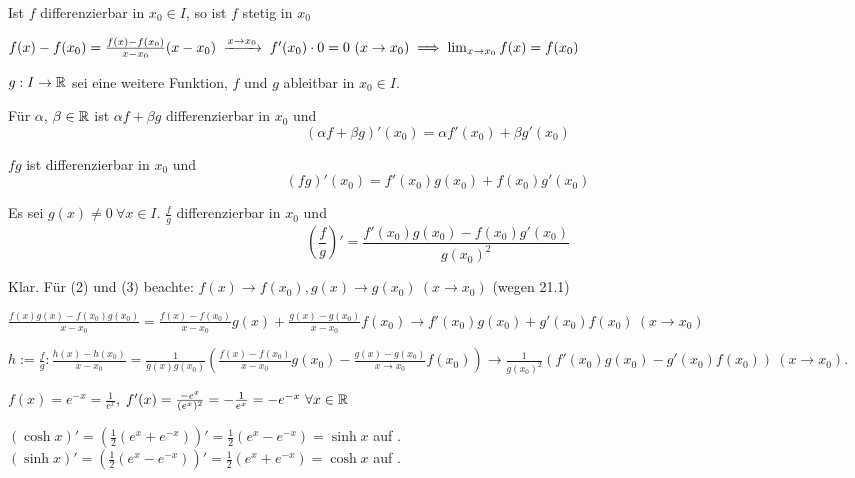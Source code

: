 \documentclass[a4paper,twoside,DIV15,BCOR12mm]{scrbook}
\begin{document}
\begin{satz}
Ist $f$ differenzierbar in $x_0\in I$, so ist $f$ stetig in $x_0$
\end{satz}

\begin{beweis}
$f(x)-f(x_0) = \frac{f(x)-f(x_0)}{x-x_0}(x-x_0) \towegen{x\to x_0} f'(x_0)\cdot 0 = 0 \ (x\to x_0) \folgt \lim_{x\to x_0}f(x) = f(x_0)$
\end{beweis}

\begin{satz}[Ableitungsregeln]
$g:I\to\mathbb{R}$ sei eine weitere Funktion, $f$ und $g$ ableitbar in $x_0 \in I$.
\begin{liste}
\item Für $\alpha$, $\beta \in \mathbb{R}$ ist $\alpha f + \beta g$ differenzierbar in $x_0$ und $$(\alpha f+ \beta g)'(x_0) = \alpha f'(x_0) + \beta g'(x_0)$$
\item $fg$ ist differenzierbar in $x_0$ und $$(fg)'(x_0) = f'(x_0)g(x_0)+f(x_0)g'(x_0)$$
\item Es sei $g(x) \ne 0 \ \forall x\in I$. $\frac{f}{g}$ differenzierbar in $x_0$ und $$(\frac{f}{g})'=\frac{f'(x_0)g(x_0) - f(x_0)g'(x_0)}{g(x_0)^2}$$
\end{liste}
\end{satz}

\begin{beweis}
\begin{liste}
\item Klar. Für (2) und (3) beachte: $f(x)\to f(x_0), g(x)\to g(x_0)\ (x\to x_0)$ (wegen 21.1)
\item $\frac{f(x)g(x)-f(x_0)g(x_0)}{x-x_0} = \frac{f(x) -f(x_0)}{x-x_0}g(x) + \frac{g(x)-g(x_0)}{x-x_0}f(x_0) \to f'(x_0)g(x_0) + g'(x_0)f(x_0) \ (x\to x_0)$
\item $h:=\frac{f}{g}: \frac{h(x)-h(x_0)}{x-x_0}=\frac{1}{g(x)g(x_0)}\left(\frac{f(x)-f(x_0)}{x-x_0}g(x_0) - \frac{g(x)-g(x_0)}{x\to x_0}f(x_0)\right) \to \frac{1}{g(x_0)^2}(f'(x_0)g(x_0) - g'(x_0)f(x_0)) \ (x\to x_0)$.
\end{liste}
\end{beweis}

\begin{beispiele}
\item $f(x) = e^{-x} = \frac{1}{e^x}$, $f'(x) = \frac{-e^x}{(e^x)^2} = -\frac{1}{e^x} = -e^{-x} \ \forall x\in\mathbb{R}$
\item $(\cosh x)' = (\frac{1}{2}(e^x+e^{-x}))' = \frac{1}{2}(e^x-e^{-x}) = \sinh x$ auf \MdR.\\
 $(\sinh x)' = (\frac{1}{2}(e^x-e^{-x}))' = \frac{1}{2}(e^x+e^{-x}) = \cosh x$ auf \MdR.
\end{beispiele}
\end{document}
